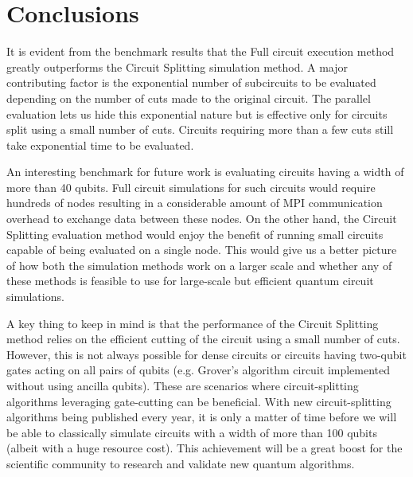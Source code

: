 \section{Conclusions}
\label{chap:conclusions}

It is evident from the benchmark results that the Full circuit execution method greatly outperforms the Circuit Splitting simulation method. A major contributing factor is the exponential number of subcircuits to be evaluated depending on the number of cuts made to the original circuit. The parallel evaluation lets us hide this exponential nature but is effective only for circuits split using a small number of cuts. Circuits requiring more than a few cuts still take exponential time to be evaluated.  

An interesting benchmark for future work is evaluating circuits having a width of more than 40 qubits. Full circuit simulations for such circuits would require hundreds of nodes resulting in a considerable amount of MPI communication overhead to exchange data between these nodes. On the other hand, the Circuit Splitting evaluation method would enjoy the benefit of running small circuits capable of being evaluated on a single node. This would give us a better picture of how both the simulation methods work on a larger scale and whether any of these methods is feasible to use for large-scale but efficient quantum circuit simulations.  

A key thing to keep in mind is that the performance of the Circuit Splitting method relies on the efficient cutting of the circuit using a small number of cuts. However, this is not always possible for dense circuits or circuits having two-qubit gates acting on all pairs of qubits (e.g. Grover's algorithm circuit implemented without using ancilla qubits). These are scenarios where circuit-splitting algorithms leveraging gate-cutting can be beneficial. With new circuit-splitting algorithms being published every year, it is only a matter of time before we will be able to classically simulate circuits with a width of more than 100 qubits (albeit with a huge resource cost). This achievement will be a great boost for the scientific community to research and validate new quantum algorithms.